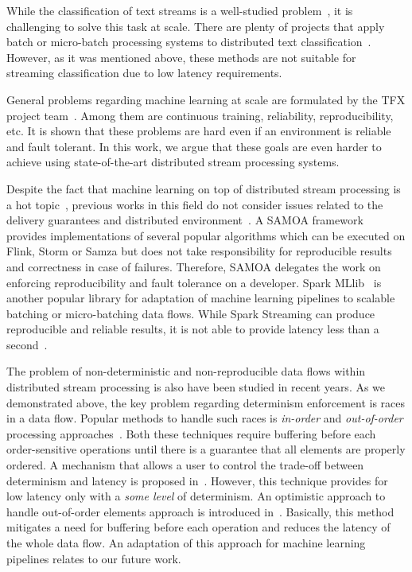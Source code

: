 \label{fs-related}

While the classification of text streams is a well-studied problem~\cite{zhang2008one, tampakas2005}, it is challenging to solve this task at scale. There are plenty of projects that apply batch or micro-batch processing systems to distributed text classification~\cite{semberecki2016distributed, 8029336, baltas2016apache, svyatkovskiy2016large}. However, as it was mentioned above, these methods are not suitable for streaming classification due to low latency requirements. 

General problems regarding machine learning at scale are formulated by the TFX project team~\cite{Baylor:2017:TTP:3097983.3098021}. Among them are continuous training, reliability, reproducibility, etc. It is shown that these problems are hard even if an environment is reliable and fault tolerant. In this work, we argue that these goals are even harder to achieve using state-of-the-art distributed stream processing systems.

Despite the fact that machine learning on top of distributed stream processing is a hot topic~\cite{qiu2016survey}, previous works in this field do not consider issues related to the delivery guarantees and distributed environment~\cite{khumoyun2016real}. A SAMOA framework~\cite{morales2015samoa} provides implementations of several popular algorithms which can be executed on Flink, Storm or Samza but does not take responsibility for reproducible results and correctness in case of failures. Therefore, SAMOA delegates the work on enforcing reproducibility and fault tolerance on a developer. Spark MLlib~\cite{meng2016mllib} is another popular library for adaptation of machine learning pipelines to scalable batching or micro-batching data flows. While Spark Streaming can produce reproducible and reliable results, it is not able to provide latency less than a second~\cite{karimov2018benchmarking, S7530084}.

The problem of non-deterministic and non-reproducible data flows within distributed stream processing is also have been studied in recent years.  As we demonstrated above, the key problem regarding determinism enforcement is races in a data flow. Popular methods to handle such races is {\em in-order} and {\em out-of-order} processing approaches~\cite{Li:2008:OPN:1453856.1453890}. Both these techniques require buffering before each order-sensitive operations until there is a guarantee that all elements are properly ordered. A mechanism that allows a user to control the trade-off between determinism and latency is proposed in~\cite{Doulkeridis:2014:SLA:2628707.2628782}. However, this technique provides for low latency only with a {\em some level} of determinism. An optimistic approach to handle out-of-order elements approach is introduced in~\cite{we2018seim}. Basically, this method mitigates a need for buffering before each operation and reduces the latency of the whole data flow. An adaptation of this approach for machine learning pipelines relates to our future work.

